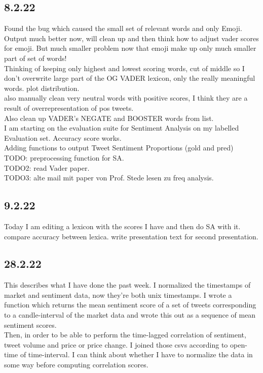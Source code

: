 \subsection{8.2.22}
Found the bug which caused the small set of relevant words and only Emoji. Output much better now, will clean up and then think how to adjust vader scores for emoji. But much smaller problem now that emoji make up only much smaller part of set of words! \\
Thinking of keeping only highest and lowest scoring words, cut of middle so I don't overwrite large part of the OG VADER lexicon, only the really meaningful words. plot distribution. \\
also manually clean very neutral words with positive scores, I think they are  a result of overrepresentation of pos tweets. \\
Also clean up VADER's NEGATE and BOOSTER words from list. \\
I am starting on the evaluation suite for Sentiment Analysis on my labelled Evaluation set. Accuracy score works. \\
Adding functions to output Tweet Sentiment Proportions (gold and pred) \\
TODO: preprocessing function for SA. \\
TODO2: read Vader paper. \\ 
TODO3: alte mail mit paper von Prof. Stede lesen zu freq analysis. \\

\subsection{9.2.22}
Today I am editing a lexicon with the scores I have and then do SA with it. compare accuracy between lexica. write presentation text for second presentation.

\subsection{28.2.22}
This describes what I have done the past week. I normalized the timestamps of market and sentiment data, now they're both unix timestamps. I wrote a function which returns the mean sentiment score of a set of tweets corresponding to a candle-interval of the market data and wrote this out as a sequence of mean sentiment scores. \\
Then, in order to be able to perform the time-lagged correlation of sentiment, tweet volume and price or price change. I joined those csvs according to open-time of time-interval. I can think about whether I have to normalize the data in some way before computing correlation scores.

